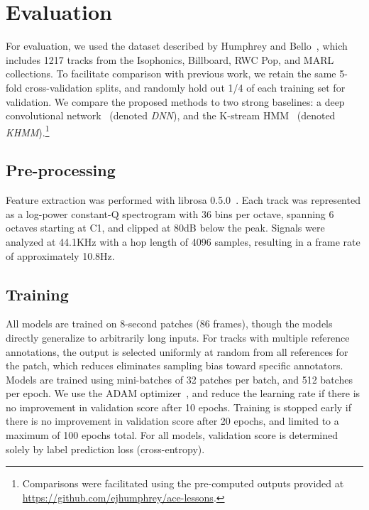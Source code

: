 \documentclass{article}
\begin{document}
\section{Evaluation}

For evaluation, we used the dataset described by Humphrey and Bello~\cite{humphrey2015four}, which includes 1217 tracks from the Isophonics, Billboard, RWC Pop, and MARL collections.
To facilitate comparison with previous work, we retain the same 5-fold cross-validation splits, and randomly hold out 1/4 of each training set for validation.
We compare the proposed methods to two strong baselines: a deep convolutional network~\cite{humphrey2015four} (denoted \emph{DNN}), and the K-stream HMM~\cite{cho2014improved} (denoted \emph{KHMM}).\footnote{Comparisons were facilitated using the pre-computed outputs provided at \url{https://github.com/ejhumphrey/ace-lessons}.}

\subsection{Pre-processing}

Feature extraction was performed with librosa 0.5.0~\cite{librosa050}.
Each track was represented as a log-power constant-Q spectrogram with 36 bins per octave, spanning 6 octaves starting at C1, and clipped at 80dB below the peak.
Signals were analyzed at 44.1KHz with a hop length of 4096 samples, resulting in a frame rate of approximately 10.8Hz.

\subsection{Training}
All models are trained on 8-second patches (86 frames), though the models directly generalize to arbitrarily long inputs.
For tracks with multiple reference annotations, the output is selected uniformly at random from all references for the patch, which reduces eliminates sampling bias toward specific annotators.
Models are trained using mini-batches of 32 patches per batch, and 512 batches per epoch.
We use the ADAM optimizer~\cite{kingma2014adam}, and reduce the learning rate if there is no improvement in validation score after 10 epochs.
Training is stopped early if there is no improvement in validation score after 20 epochs, and limited to a maximum of 100 epochs total.
For all models, validation score is determined solely by label prediction loss (cross-entropy).
\end{document}
